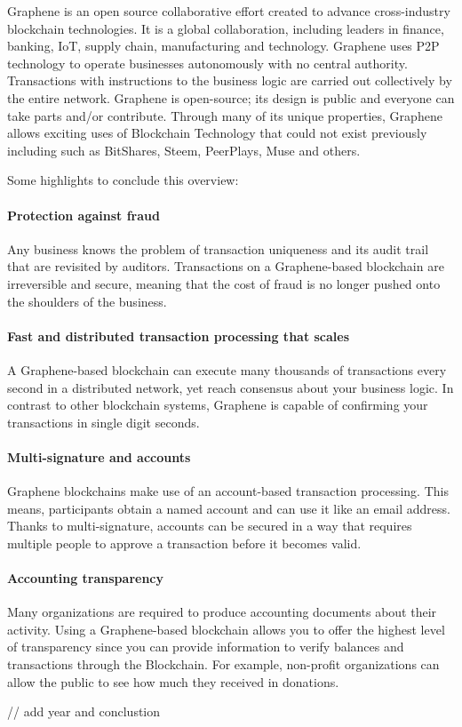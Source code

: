 Graphene is an open source collaborative effort created to advance
cross-industry blockchain technologies. It is a global collaboration,
including leaders in finance, banking, IoT, supply chain, manufacturing
and technology.
Graphene uses P2P technology to operate businesses autonomously
with no central authority. Transactions with instructions to the
business logic are carried out collectively by the entire network.
Graphene is open-source; its design is public and everyone can take
parts and/or contribute. Through many of its unique properties, Graphene allows exciting
uses of Blockchain Technology that could not exist previously including
such as BitShares, Steem, PeerPlays, Muse and others.

Some highlights to conclude this overview:

\paragraph{Protection against fraud}
Any business knows the problem of transaction uniqueness and its audit
trail that are revisited by auditors. Transactions on a Graphene-based
blockchain are irreversible and secure, meaning that the cost of fraud
is no longer pushed onto the shoulders of the business.

\paragraph{Fast and distributed transaction processing that scales}
A Graphene-based blockchain can execute many thousands of transactions
every second in a distributed network, yet reach consensus about your
business logic. In contrast to other blockchain systems, Graphene is
capable of confirming your transactions in single digit seconds.

\paragraph{Multi-signature and accounts}
Graphene blockchains make use of an account-based transaction
processing. This means, participants obtain a named account and can use
it like an email address. Thanks to multi-signature, accounts can be
secured in a way that requires multiple people to approve a transaction
before it becomes valid.

\paragraph{Accounting transparency}
Many organizations are required to produce accounting documents about
their activity. Using a Graphene-based blockchain allows you to offer
the highest level of transparency since you can provide information to
verify balances and transactions through the Blockchain. For example,
non-profit organizations can allow the public to see how much they
received in donations.

// add year and conclustion